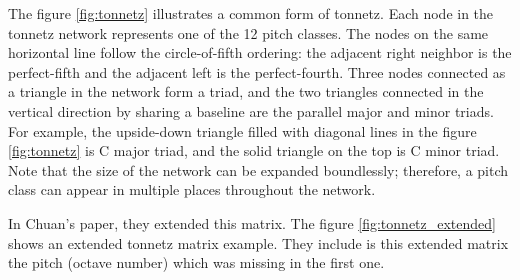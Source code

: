 \documentclass[12pt]{report}
\begin{document}
The figure \ref{fig:tonnetz} illustrates a common form of tonnetz.
Each node in the tonnetz network represents one of the 12 pitch classes.
The nodes on the same horizontal line follow the circle-of-fifth ordering: the adjacent right neighbor is the perfect-fifth and the adjacent left is the perfect-fourth.
Three nodes connected as a triangle in the network form a triad, and the two triangles connected in the vertical direction by sharing a baseline are the parallel major and minor triads.
For example, the upside-down triangle filled with diagonal lines in the figure \ref{fig:tonnetz} is C major triad, and the solid triangle on the top is C minor triad. Note that the size of the network can be expanded boundlessly; therefore, a pitch class can appear in multiple places throughout the network.

In Chuan's paper, they extended this matrix.
The figure \ref{fig:tonnetz_extended} shows an extended tonnetz matrix example.
They include is this extended matrix the pitch (octave number) which was missing in the first one.
\end{document}
